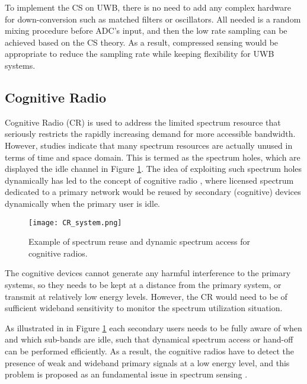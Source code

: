 To implement the CS on UWB, there is no need to add any complex hardware for down-conversion such as matched filters or oscillators. All needed is a random mixing procedure before ADC's input, and then the low rate  sampling can be achieved based on the CS theory. As a result, compressed sensing would be appropriate to reduce the sampling rate while keeping flexibility for UWB systems. 


\subsection{Cognitive Radio}

Cognitive Radio (CR) is used to address the limited spectrum resource that seriously restricts the rapidly increasing demand for more accessible bandwidth.  However, studies \cite{larsson2008cognitive} indicate that many spectrum resources are actually unused in terms of time and space domain. This is termed as the spectrum holes, which are displayed the idle channel
in Figure \ref{CR_system}. The idea of exploiting such spectrum holes dynamically has led to the concept of cognitive radio \cite{axell2012spectrum}, where licensed spectrum dedicated to a primary network
would be reused by secondary (cognitive) devices dynamically when the primary user is idle.

\begin{figure}[tbh]
\begin{center}
\noindent
  \texttt{[image: CR\_system.png]}
  \end{center}
    \caption{Example of spectrum reuse and dynamic spectrum access for cognitive radios.}\label{CR_system}
\end{figure}

The cognitive devices cannot generate any harmful interference to the primary systems, so they needs to be kept at a distance
from the primary system, or transmit at relatively low energy levels. However, the CR would need to be of sufficient wideband sensitivity to monitor the spectrum utilization situation. 

As illustrated in in Figure \ref{CR_system} each secondary users needs to be fully aware of when and which sub-bands are idle, such that dynamical spectrum access or hand-off can be performed efficiently. As a result, the cognitive radios have to detect the presence of weak and wideband primary signals at a low energy level, and this problem is proposed as an fundamental issue in spectrum sensing \cite{sahai2004some}. 


